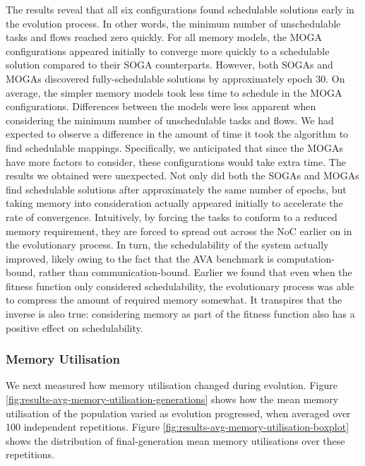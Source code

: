 \documentclass[10pt,conference]{IEEEtran}
\begin{document}
The results reveal that all six configurations found schedulable solutions early in the evolution process. In other words, the minimum number of unschedulable tasks and flows reached zero quickly. For all memory models, the MOGA configurations appeared initially to converge more quickly to a schedulable solution compared to their SOGA counterparts. However, both SOGAs and MOGAs discovered fully-schedulable solutions by approximately epoch 30. On average, the simpler memory models took less time to schedule in the MOGA configurations. Differences between the models were less apparent when considering the minimum number of unschedulable tasks and flows. We had expected to observe a difference in the amount of time it took the algorithm to find schedulable mappings. Specifically, we anticipated that since the MOGAs have more factors to consider, these configurations would take extra time. The results we obtained were unexpected. Not only did both the SOGAs and MOGAs find schedulable solutions after approximately the same number of epochs, but taking memory into consideration actually appeared initially to accelerate the rate of convergence. Intuitively, by forcing the tasks to conform to a reduced memory requirement, they are forced to spread out across the NoC earlier on in the evolutionary process. In turn, the schedulability of the system actually improved, likely owing to the fact that the AVA benchmark is computation-bound, rather than communication-bound. Earlier we found that even when the fitness function only considered schedulability, the evolutionary process was able to compress the amount of required memory somewhat. It transpires that the inverse is also true: considering memory as part of the fitness function also has a positive effect on schedulability.

\subsubsection{Memory Utilisation}\label{sec:memory-utilisation}

We next measured how memory utilisation changed during evolution. Figure \ref{fig:results-avg-memory-utilisation-generations} shows how the mean memory utilisation of the population varied as evolution progressed, when averaged over 100 independent repetitions. Figure \ref{fig:results-avg-memory-utilisation-boxplot} shows the distribution of final-generation mean memory utilisations over these repetitions.
\end{document}
